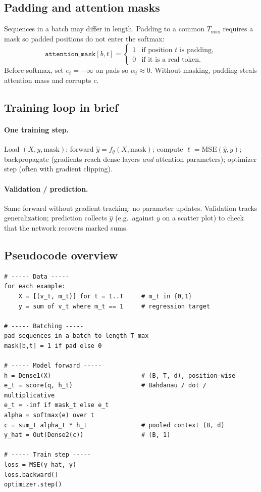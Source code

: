 \documentclass[11pt]{article}
\begin{document}
\subsection{Padding and attention masks}

Sequences in a batch may differ in length. Padding to a common
\(T_{\max}\) requires a mask so padded positions do not enter the softmax:
\[
  \texttt{attention\_mask}[b,t]
  =
  \begin{cases}
  1 & \text{if position \(t\) is padding}, \\
  0 & \text{if it is a real token}.
  \end{cases}
\]
Before softmax, set \(e_t=-\infty\) on pads so \(\alpha_t\approx 0\).
Without masking, padding steals attention mass and corrupts \(c\).

\subsection{Training loop in brief}

\paragraph{One training step.}
Load \((X,y,\mathrm{mask})\); forward \(\hat{y}=f_\theta(X,\mathrm{mask})\);
compute \(\ell=\mathrm{MSE}(\hat{y},y)\); backpropagate (gradients reach
dense layers \emph{and} attention parameters); optimizer step (often with
gradient clipping).

\paragraph{Validation / prediction.}
Same forward without gradient tracking: no parameter updates. Validation
tracks generalization; prediction collects \(\hat{y}\) (e.g.\ against \(y\)
on a scatter plot) to check that the network recovers marked sums.

\subsection{Pseudocode overview}

\begin{verbatim}
# ----- Data -----
for each example:
    X = [(v_t, m_t)] for t = 1..T     # m_t in {0,1}
    y = sum of v_t where m_t == 1     # regression target

# ----- Batching -----
pad sequences in a batch to length T_max
mask[b,t] = 1 if pad else 0

# ----- Model forward -----
h = Dense1(X)                         # (B, T, d), position-wise
e_t = score(q, h_t)                   # Bahdanau / dot / multiplicative
e_t = -inf if mask_t else e_t
alpha = softmax(e) over t
c = sum_t alpha_t * h_t               # pooled context (B, d)
y_hat = Out(Dense2(c))                # (B, 1)

# ----- Train step -----
loss = MSE(y_hat, y)
loss.backward()
optimizer.step()
\end{verbatim}
\end{document}
